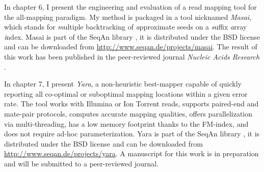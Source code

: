 In chapter 6, I present the engineering and evaluation of a read mapping tool for the all-mapping paradigm.
My method is packaged in a \CC tool nicknamed \emph{Masai}, which stands for \emph{m}ultiple backtracking of \emph{a}pproximate seeds on a \emph{s}uffix \emph{a}rray \emph{i}ndex.
Masai is part of the SeqAn library \citep{Doering2008}, it is distributed under the BSD license and can be downloaded from \url{http://www.seqan.de/projects/masai}.
The result of this work has been published in the peer-reviewed journal \emph{Nucleic Acids Research} \citep{Siragusa2013}.

In chapter 7, I present \emph{Yara}, a non-heuristic best-mapper capable of quickly reporting all co-optimal or suboptimal mapping locations within a given error rate.
The tool works with Illumina or Ion Torrent reads, supports paired-end and mate-pair protocols, computes accurate mapping qualities, offers parallelization via multi-threading, has a low memory footprint thanks to the FM-index, and does not require ad-hoc parameterization.
Yara is part of the SeqAn library \citep{Doering2008}, it is distributed under the BSD license and can be downloaded from \url{http://www.seqan.de/projects/yara}.
A manuscript for this work is in preparation and will be submitted to a peer-reviewed journal.


